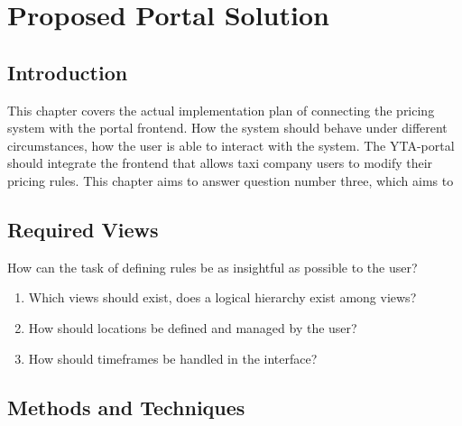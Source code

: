 \chapter{Proposed Portal Solution}

\ifpdf
    \graphicspath{{Chapter4/Figs/Raster/}{Chapter4/Figs/PDF/}{Chapter4/Figs/}}
\else
    \graphicspath{{Chapter4/Figs/Vector/}{Chapter4/Figs/}}
\fi

\section{Introduction}

This chapter covers the actual implementation plan of connecting the pricing system with the portal frontend. How the system should behave under different circumstances, how the user is able to interact with the system. The YTA-portal should integrate the frontend that allows taxi company users to modify their pricing rules. This chapter aims to answer question number three, which aims to 

\section{Required Views}



How can the task of defining rules be as insightful as possible to the user?
\begin{enumerate}
    \item Which views should exist, does a logical hierarchy exist among views?
    \item How should locations be defined and managed by the user?
    \item How should timeframes be handled in the interface?
\end{enumerate}

\section{Methods and Techniques}
